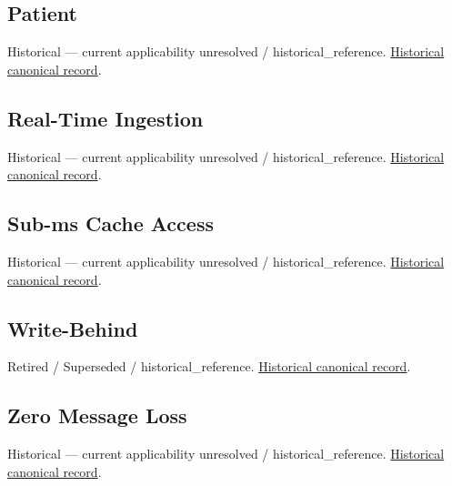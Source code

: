 \subsection{Patient}

\par\label{element:5f6d333e94634420b8a8bbf8b9cb6e2a}
Historical — current applicability unresolved / historical\_reference. \href{../../../../continuum/motivation/stakeholder/5f6d333e94634420b8a8bbf8b9cb6e2a.md}{Historical canonical record}.\par

\subsection{Real-Time Ingestion}

\par\label{element:d43c345839e548589e2b6aa677022f8b}
Historical — current applicability unresolved / historical\_reference. \href{../../../../continuum/motivation/goal/d43c345839e548589e2b6aa677022f8b.md}{Historical canonical record}.\par

\subsection{Sub-ms Cache Access}

\par\label{element:f699096b8d0f4f5690eb57b25001b5e5}
Historical — current applicability unresolved / historical\_reference. \href{../../../../continuum/motivation/goal/f699096b8d0f4f5690eb57b25001b5e5.md}{Historical canonical record}.\par

\subsection{Write-Behind}

\par\label{element:a5dffc0325d44915971eea600bba48f1}
Retired / Superseded / historical\_reference. \href{../../../../continuum/motivation/principle/a5dffc0325d44915971eea600bba48f1.md}{Historical canonical record}.\par

\subsection{Zero Message Loss}

\par\label{element:8f70dbb9c28f4dd9afe91c21243e5914}
Historical — current applicability unresolved / historical\_reference. \href{../../../../continuum/motivation/goal/8f70dbb9c28f4dd9afe91c21243e5914.md}{Historical canonical record}.\par

